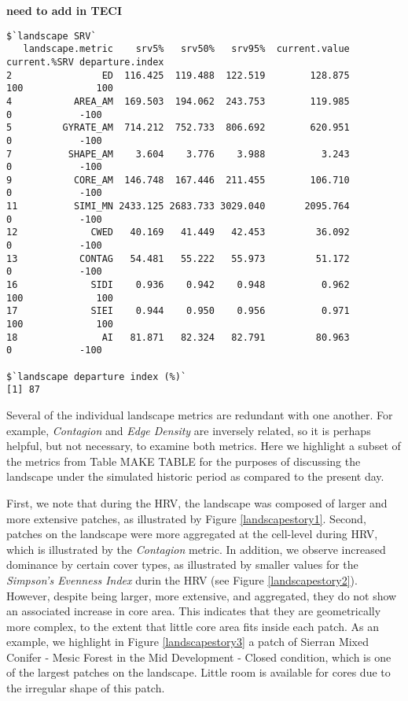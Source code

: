 \textbf{need to add in TECI}
\begin{verbatim}
$`landscape SRV`
   landscape.metric    srv5%   srv50%   srv95%  current.value current.%SRV departure.index
2                ED  116.425  119.488  122.519        128.875          100             100
4           AREA_AM  169.503  194.062  243.753        119.985            0            -100
5         GYRATE_AM  714.212  752.733  806.692        620.951            0            -100
7          SHAPE_AM    3.604    3.776    3.988          3.243            0            -100
9           CORE_AM  146.748  167.446  211.455        106.710            0            -100
11          SIMI_MN 2433.125 2683.733 3029.040       2095.764            0            -100
12             CWED   40.169   41.449   42.453         36.092            0            -100
13           CONTAG   54.481   55.222   55.973         51.172            0            -100
16             SIDI    0.936    0.942    0.948          0.962          100             100
17             SIEI    0.944    0.950    0.956          0.971          100             100
18               AI   81.871   82.324   82.791         80.963            0            -100

$`landscape departure index (%)`
[1] 87
\end{verbatim}

Several of the individual landscape metrics are redundant with one another. For example, \emph{Contagion} and \emph{Edge Density} are inversely related, so it is perhaps helpful, but not necessary, to examine both metrics. Here we highlight a subset of the metrics from Table MAKE TABLE for the purposes of discussing the landscape under the simulated historic period as compared to the present day.

First, we note that during the HRV, the landscape was composed of larger and more extensive patches, as illustrated by Figure \ref{landscapestory1}. 
Second, patches on the landscape were more aggregated at the cell-level during HRV, which is illustrated by the \emph{Contagion} metric. In addition, we observe increased dominance by certain cover types, as illustrated by smaller values for the \emph{Simpson's Evenness Index} durin the HRV (see Figure \ref{landscapestory2}). However, despite being larger, more extensive, and aggregated, they do not show an associated increase in core area. This indicates that they are geometrically more complex, to the extent that little core area fits inside each patch. As an example, we highlight in Figure \ref{landscapestory3} a patch of Sierran Mixed Conifer - Mesic Forest in the Mid Development - Closed condition, which is one of the largest patches on the landscape. Little room is available for cores due to the irregular shape of this patch.


